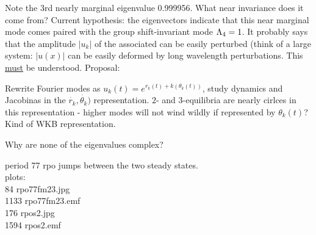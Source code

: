 Note the 3rd nearly marginal eigenvalue 0.999956. What near
invariance does it come from? Current hypothesis: the eigenvectors
indicate that this near marginal mode comes paired with the 
group shift-invariant mode $\Lambda_4 =1$. It probably says that
the amplitude $|u_k|$ of the associated can be easily perturbed (think of
a large system: $|u(x)|$ can be easily deformed by long wavelength
perturbations. This \underline{must} be understood. Proposal:

Rewrite Fourier modes as $u_k(t) = e^{r_k(t) + k(\theta_k(t))}$, study
dynamics and Jacobinas in the $\dot{r_k},\dot{\theta_k})$ representation.
$2$- and $3$-equilibria are nearly cirlces in this representation - higher
modes will not wind wildly if represented by $\theta_k(t)$? Kind of WKB
representation.


Why are none of the eigenvalues complex?

period 77 rpo jumps between the two steady states.
\\
plots:	\\
  84 rpo77fm23.jpg	\\
1133 rpo77fm23.emf	\\
 176 rpos2.jpg	\\
1594 rpos2.emf	\\


